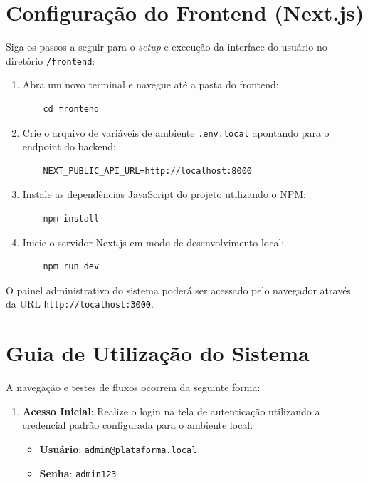 \documentclass[12pt, openright, oneside, a4paper, brazil]{ads-unipac-abntex2}
\begin{document}
\begin{anexosenv}
\section{Configuração do Frontend (Next.js)}
Siga os passos a seguir para o \textit{setup} e execução da interface do usuário no diretório \verb|/frontend|:

\begin{enumerate}
    \item Abra um novo terminal e navegue até a pasta do frontend:
    \begin{verbatim}
    cd frontend
    \end{verbatim}
    
    \item Crie o arquivo de variáveis de ambiente \verb|.env.local| apontando para o endpoint do backend:
    \begin{verbatim}
    NEXT_PUBLIC_API_URL=http://localhost:8000
    \end{verbatim}
    
    \item Instale as dependências JavaScript do projeto utilizando o NPM:
    \begin{verbatim}
    npm install
    \end{verbatim}
    
    \item Inicie o servidor Next.js em modo de desenvolvimento local:
    \begin{verbatim}
    npm run dev
    \end{verbatim}
\end{enumerate}
O painel administrativo do sistema poderá ser acessado pelo navegador através da URL \verb|http://localhost:3000|.

\section{Guia de Utilização do Sistema}
A navegação e testes de fluxos ocorrem da seguinte forma:
\begin{enumerate}
    \item \textbf{Acesso Inicial}: Realize o login na tela de autenticação utilizando a credencial padrão configurada para o ambiente local:
    \begin{itemize}
        \item \textbf{Usuário}: \verb|admin@plataforma.local|
        \item \textbf{Senha}: \verb|admin123|
    \end{itemize}
    

\end{enumerate}
\end{anexosenv}
\end{document}
